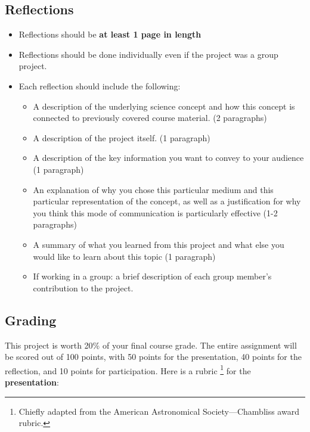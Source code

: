 \documentclass[11pt]{article}
\begin{document}
\subsection*{Reflections}
\begin{itemize}[noitemsep]
    \item Reflections should be \textbf{at least 1 page in length}
    \item Reflections should be done individually even if the project was a group project.
    \item Each reflection should include the following:
    \begin{itemize}
        \item A description of the underlying science concept and how this concept is connected to previously covered course material. (2 paragraphs)
        \item A description of the project itself. (1 paragraph)
        \item A description of the key information you want to convey to your audience (1 paragraph)
        \item An explanation of why you chose this particular medium and this particular representation of the concept, as well as a justification for why you think this mode of communication is particularly effective (1-2 paragraphs)
        \item A summary of what you learned from this project and what else you would like to learn about this topic (1 paragraph)
        \item If working in a group: a brief description of each group member’s contribution to the project.

    \end{itemize}
\end{itemize}

\subsection*{Grading}
This project is worth 20\% of your final course grade. The entire assignment will be scored out of 100 points, with 50 points for the presentation, 40 points for the reflection, and 10 points for participation. Here is a rubric \footnote{Chiefly adapted from the American Astronomical Society---Chambliss award rubric.} for the \textbf{presentation}: \bigskip
\end{document}
